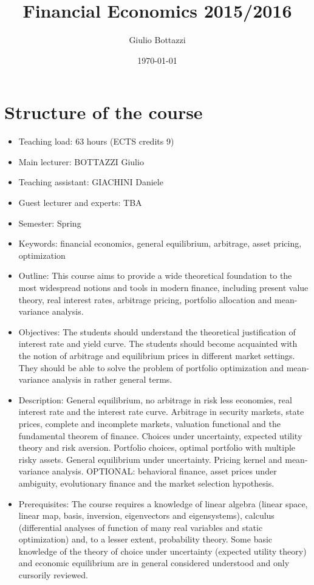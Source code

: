 \documentclass[11pt]{article}
\author{Giulio Bottazzi}
\date{\today}
\title{Financial Economics 2015/2016}
\begin{document}
\maketitle
\tableofcontents


\section{Structure of the course}
\label{sec-1}

\begin{itemize}
\item Teaching load: 63 hours (ECTS credits 9)
\item Main lecturer: BOTTAZZI Giulio
\item Teaching assistant: GIACHINI Daniele
\item Guest lecturer and experts: TBA
\item Semester: Spring
\item Keywords: financial economics, general equilibrium, arbitrage,
asset pricing, optimization

\item Outline: This course aims to provide a wide theoretical foundation
to the most widespread notions and tools in modern finance,
including present value theory, real interest rates, arbitrage
pricing, portfolio allocation and mean-variance analysis.

\item Objectives: The students should understand the theoretical
justification of interest rate and yield curve. The students
should become acquainted with the notion of arbitrage and
equilibrium prices in different market settings. They should be
able to solve the problem of portfolio optimization and
mean-variance analysis in rather general terms.

\item Description: General equilibrium, no arbitrage in risk less
economies, real interest rate and the interest rate
curve. Arbitrage in security markets, state prices, complete and
incomplete markets, valuation functional and the fundamental
theorem of finance. Choices under uncertainty, expected utility
theory and risk aversion. Portfolio choices, optimal portfolio
with multiple risky assets. General equilibrium under
uncertainty. Pricing kernel and mean-variance analysis. OPTIONAL:
behavioral finance, asset prices under ambiguity, evolutionary
finance and the market selection hypothesis.

\item Prerequisites: The course requires a knowledge of linear algebra
(linear space, linear map, basis, inversion, eigenvectors and
eigensystems), calculus (differential analyses of function of many
real variables and static optimization) and, to a lesser extent,
probability theory. Some basic knowledge of the theory of choice
under uncertainty (expected utility theory) and economic
equilibrium are in general considered understood and only
cursorily reviewed.


\end{itemize}
\end{document}
